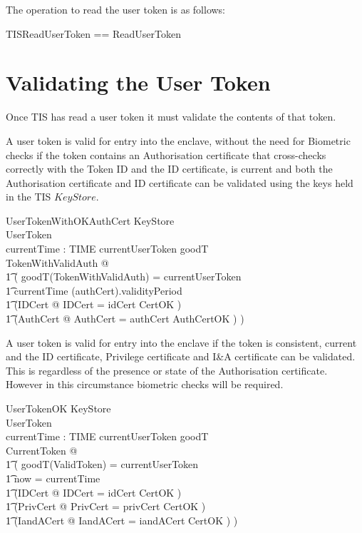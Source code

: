 The operation to read the user token is as follows:

\begin{zed}
        TISReadUserToken ==  ReadUserToken
\end{zed}


\section{Validating the User Token}
Once TIS has read a user token it must validate the contents of that
token.

A user token is valid for entry into the enclave, without the need for
Biometric checks if the token contains an Authorisation certificate that
cross-checks correctly with the Token ID and the ID certificate, is
current and  both the Authorisation certificate and ID certificate can be
validated using the keys held in the TIS $KeyStore$. 

\begin{schema}{UserTokenWithOKAuthCert}
        KeyStore
\\      UserToken
\\      currentTime : TIME
\where
        currentUserToken \in \ran goodT
\\	\exists TokenWithValidAuth @ 
\\ \t1		(
		goodT(\theta TokenWithValidAuth) = currentUserToken
\\ \t1		\land currentTime \in (\The authCert).validityPeriod
\\ \t1          \land (\exists IDCert @ \theta IDCert = idCert \land CertOK )
\\ \t1          \land (\exists AuthCert @ \theta AuthCert = \The
authCert \land AuthCertOK )  
		)
\end{schema}



A user token is valid for entry into the enclave if the token is
consistent, current and the ID
certificate, Privilege certificate and I\&A certificate can be validated. This is regardless of the
presence or state of the Authorisation certificate. However in this
circumstance biometric checks will be required.

\begin{schema}{UserTokenOK}
        KeyStore
\\      UserToken
\\      currentTime : TIME
\where
 	currentUserToken \in \ran goodT
\\	\exists CurrentToken @ 
\\ \t1		(
		goodT(\theta ValidToken) = currentUserToken
\\ \t1		\land now = currentTime
\\ \t1          \land (\exists IDCert @ \theta IDCert = idCert \land CertOK )
\\ \t1          \land (\exists PrivCert @ \theta PrivCert = privCert
\land CertOK )
\\ \t1          \land (\exists IandACert @ \theta IandACert =
iandACert \land CertOK )  
                )
\end{schema}

